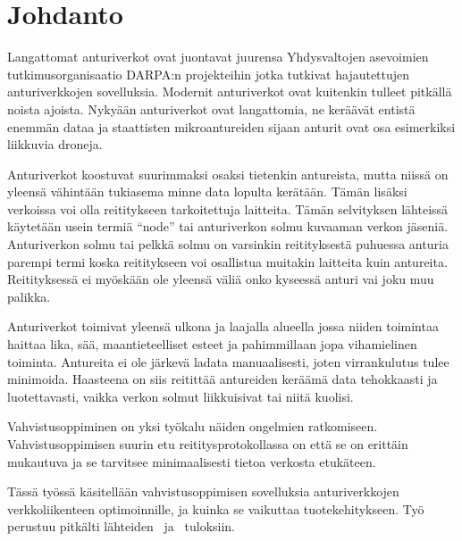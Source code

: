 \section{Johdanto}
Langattomat anturiverkot ovat juontavat juurensa Yhdysvaltojen asevoimien
tutkimusorganisaatio DARPA:n projekteihin jotka tutkivat hajautettujen
anturiverkkojen sovelluksia. Modernit anturiverkot ovat kuitenkin tulleet
pitkällä noista ajoista. Nykyään anturiverkot ovat langattomia, ne keräävät
entistä enemmän dataa ja staattisten mikroantureiden sijaan anturit ovat osa
esimerkiksi liikkuvia droneja.

Anturiverkot koostuvat suurimmaksi osaksi tietenkin antureista, mutta niissä on
yleensä vähintään tukiasema minne data lopulta kerätään. Tämän lisäksi
verkoissa voi olla reititykseen tarkoitettuja laitteita.  Tämän selvityksen
lähteissä käytetään usein termiä ``node'' tai anturiverkon solmu kuvaaman
verkon jäseniä.  Anturiverkon solmu tai pelkkä solmu on varsinkin reitityksestä
puhuessa anturia parempi termi koska reititykseen voi osallistua muitakin
laitteita kuin antureita. Reitityksessä ei myöskään ole yleensä väliä onko
kyseessä anturi vai joku muu palikka.

Anturiverkot toimivat yleensä ulkona ja laajalla alueella jossa niiden
toimintaa haittaa lika, sää, maantieteelliset esteet ja pahimmillaan jopa
vihamielinen toiminta. Antureita ei ole järkevä ladata manuaalisesti, joten
virrankulutus tulee minimoida. Haasteena on siis reitittää antureiden keräämä
data tehokkaasti ja luotettavasti, vaikka verkon solmut liikkuisivat tai niitä
kuolisi.

Vahvistusoppiminen on yksi työkalu näiden ongelmien ratkomiseen.
Vahvistusoppimisen suurin etu reititysprotokollassa on että se on erittäin
mukautuva ja se tarvitsee minimaalisesti tietoa verkosta etukäteen.

Tässä työssä käsitellään vahvistusoppimisen sovelluksia anturiverkkojen
verkkoliikenteen optimoinnille, ja kuinka se vaikuttaa tuotekehitykseen. Työ
perustuu pitkälti lähteiden~\cite{Arya2015} ja~\cite{Yu2006} tuloksiin.
